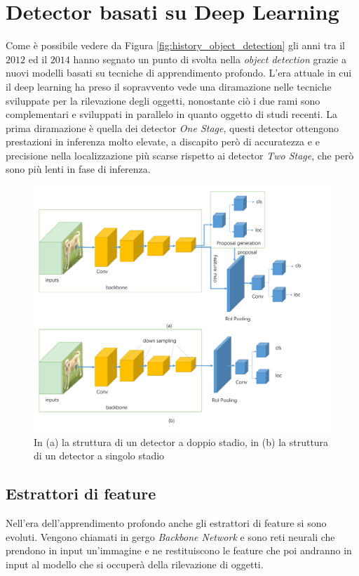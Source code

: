\section{Detector basati su Deep Learning}
\label{sec:deep_learning_obj}
Come è possibile vedere da Figura \ref{fig:history_object_detection} gli anni tra il $2012$ ed il $2014$ hanno segnato un punto di svolta nella \textit{object detection} grazie a nuovi modelli basati su tecniche di apprendimento profondo. L'era attuale in cui il deep learning ha preso il sopravvento vede una diramazione nelle tecniche sviluppate per la rilevazione degli oggetti, nonostante ciò i due rami sono complementari e sviluppati in parallelo in quanto oggetto di studi recenti. La prima diramazione è quella dei detector \textit{One Stage}, questi detector ottengono prestazioni in inferenza molto elevate, a discapito però di accuratezza e e precisione nella localizzazione più scarse rispetto ai detector \textit{Two Stage}, che però sono più lenti in fase di inferenza. 
\begin{figure}[]
    \centering
    \includegraphics[width=\textwidth]{images/architectures_one_two_stage.pdf}
    \caption{In (a) la struttura di un detector a doppio stadio, in (b) la struttura di un detector a singolo stadio \cite{DBLP:journals/corr/abs-1907-09408}}
    \label{fig:detector_structure}
\end{figure}
\subsection{Estrattori di feature}
\label{sec:feature_extractor}
Nell'era dell'apprendimento profondo anche gli estrattori di feature si sono evoluti. Vengono chiamati in gergo \textit{Backbone Network} e sono reti neurali che prendono in input un'immagine e ne restituiscono le feature che poi andranno in input al modello che si occuperà della rilevazione di oggetti. 

